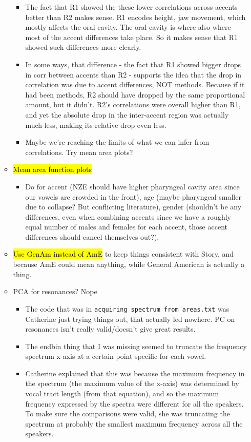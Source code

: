 \documentclass{article}
\begin{document}
\begin{itemize}
\begin{itemize}
\begin{itemize}
            \item The fact that R1 showed the these lower correlations across accents better than R2 makes sense. R1 encodes height, jaw movement, which mostly affects the oral cavity. The oral cavity is where also where most of the accent differences take place. So it makes sense that R1 showed such differences more clearly.
            \item In some ways, that difference - the fact that R1 showed bigger drops in corr between accents than R2 - supports the idea that the drop in correlation was due to accent differences, NOT methods. Because if it had been methods, R2 should have dropped by the same proportional amount, but it didn't. R2's correlations were overall higher than R1, and yet the absolute drop in the inter-accent region was actually much less, making its relative drop even less.
            \item Maybe we're reaching the limits of what we can infer from correlations. Try mean area plots?
        \end{itemize}
        \item \hl{Mean area function plots}
        \begin{itemize}
            \item Do for accent (NZE should have higher pharyngeal cavity area since our vowels are crowded in the front), age (maybe pharyngeal smaller due to collapse? But conflicting literature), gender (shouldn't be any differences, even when combining accents since we have a roughly equal number of males and females for each accent, those accent differences should cancel themselves out?).
        \end{itemize}
        \item \hl{Use GenAm instead of AmE} to keep things consistent with Story, and because AmE could mean anything, while General American is actually a thing.
        \item PCA for resonances? Nope
        \begin{itemize}
            \item The code that was in \verb|acquiring spectrum from areas.txt| was Catherine just trying things out, that actually led nowhere. PC on resonances isn't really valid/doesn't give great results.
            \item The endbin thing that I was missing seemed to truncate the frequency spectrum x-axis at a certain point specific for each vowel.
            \item Catherine explained that this was because the maximum frequency in the spectrum (the maximum value of the x-axis) was determined by vocal tract length (from that equation), and so the maximum frequency expressed by the spectra were different for all the speakers. To make sure the comparisons were valid, she was truncating the spectrum at probably the smallest maximum frequency across all the speakers.

\end{itemize}
\end{itemize}
\end{itemize}
\end{document}
